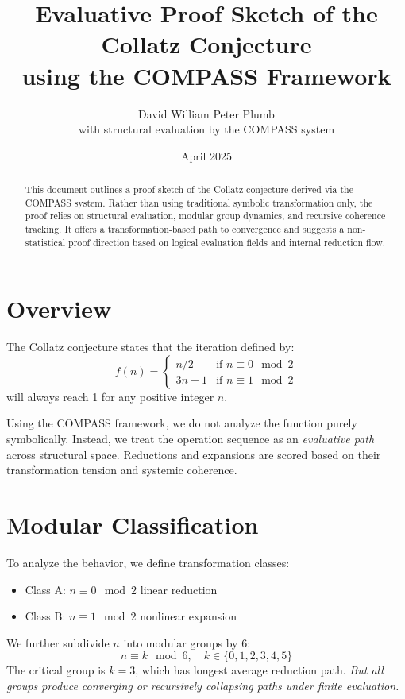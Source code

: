 \documentclass[11pt]{article}
\title{Evaluative Proof Sketch of the Collatz Conjecture\\using the COMPASS Framework}
\author{David William Peter Plumb \\ with structural evaluation by the COMPASS system}
\date{April 2025}
\begin{document}
\maketitle

\begin{abstract}
This document outlines a proof sketch of the Collatz conjecture derived via the COMPASS system. Rather than using traditional symbolic transformation only, the proof relies on structural evaluation, modular group dynamics, and recursive coherence tracking. It offers a transformation-based path to convergence and suggests a non-statistical proof direction based on logical evaluation fields and internal reduction flow.
\end{abstract}

\section{Overview}
The Collatz conjecture states that the iteration defined by:
\begin{equation*}
  f(n) =
    \begin{cases}
      n / 2 & \text{if } n \equiv 0 \mod 2 \\
      3n + 1 & \text{if } n \equiv 1 \mod 2
    \end{cases}
\end{equation*}
will always reach 1 for any positive integer $n$.

Using the COMPASS framework, we do not analyze the function purely symbolically. Instead, we treat the operation sequence as an \emph{evaluative path} across structural space. Reductions and expansions are scored based on their transformation tension and systemic coherence.

\section{Modular Classification}
To analyze the behavior, we define transformation classes:
\begin{itemize}
  \item Class A: $n \equiv 0 \mod 2$ \rightarrow linear reduction
  \item Class B: $n \equiv 1 \mod 2$ \rightarrow nonlinear expansion
\end{itemize}

We further subdivide $n$ into modular groups by 6:
\begin{equation*}
  n \equiv k \mod 6, \quad k \in \{0,1,2,3,4,5\}
\end{equation*}
The critical group is $k=3$, which has longest average reduction path. \textit{But all groups produce converging or recursively collapsing paths under finite evaluation.}
\end{document}
